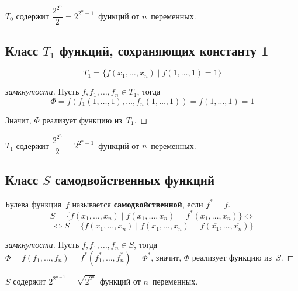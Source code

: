 $T_0$ содержит $\dfrac{2^{2^n}}2 = 2^{2^n - 1}$~функций от $n$~переменных.

\subsection{Класс \texorpdfstring{$T_1$}{} функций, сохраняющих константу 1}
\begin{equation*}
T_1 = \{ f(x_1, \ldots, x_n) \mid f(1, \ldots, 1) = 1 \}
\end{equation*}
\begin{proof}[замкнутости]
Пусть $f, f_1, \ldots, f_n \in T_1$, тогда
\begin{equation*}
\Phi =
f(f_1(1, \ldots, 1), \ldots, f_n(1, \ldots, 1)) =
f(1, \ldots, 1) = 1
\end{equation*}

Значит, $\Phi$ реализует функцию из~$T_1$.
\end{proof}

$T_1$ содержит $\dfrac{2^{2^n}}2 = 2^{2^n - 1}$~функций от $n$~переменных.

\subsection{Класс \texorpdfstring{$S$}{} самодвойственных функций}
 Булева функция~$f$ называется \textbf{самодвойственной}, если $f^* = f$.
\begin{equation*}
S = \{ f(x_1, \ldots, x_n) \mid
f(x_1, \ldots, x_n) = f^*(x_1, \ldots, x_n) \} \Leftrightarrow
\end{equation*}
\begin{equation*}
\Leftrightarrow S = \{ f(x_1, \ldots, x_n) \mid
f(x_1, \ldots, x_n) = \overline f(\overline{x_1}, \ldots, \overline{x_n}) \}
\end{equation*}
\begin{proof}[замкнутости]
Пусть $f, f_1, \ldots, f_n \in S$, тогда $\Phi = f(f_1, \ldots, f_n) = f^*(f_1^*, \ldots, f_n^*) = \Phi^*$, значит, $\Phi$ реализует функцию из~$S$.
\end{proof}

$S$ содержит $2^{2^{n-1}} = \sqrt{2^{2^n}}$~функций от $n$~переменных.

